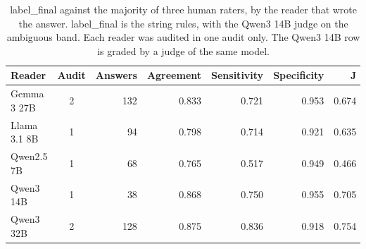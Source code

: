 \begin{table}[t]
\centering\small
\setlength{\tabcolsep}{4pt}
\caption{label\_final against the majority of three human raters, by the reader that wrote the answer. label\_final is the string rules, with the Qwen3 14B judge on the ambiguous band. Each reader was audited in one audit only. The Qwen3 14B row is graded by a judge of the same model.}
\label{tab:extra_agreement}
\begin{tabular*}{\linewidth}{@{\extracolsep{\fill}}lcrrrrr}
\toprule
Reader & Audit & Answers & Agreement & Sensitivity & Specificity & J \\
\midrule
Gemma 3 27B & 2 & 132 & 0.833 & 0.721 & 0.953 & 0.674 \\
Llama 3.1 8B & 1 & 94 & 0.798 & 0.714 & 0.921 & 0.635 \\
Qwen2.5 7B & 1 & 68 & 0.765 & 0.517 & 0.949 & 0.466 \\
Qwen3 14B & 1 & 38 & 0.868 & 0.750 & 0.955 & 0.705 \\
Qwen3 32B & 2 & 128 & 0.875 & 0.836 & 0.918 & 0.754 \\
\bottomrule
\end{tabular*}
\end{table}
